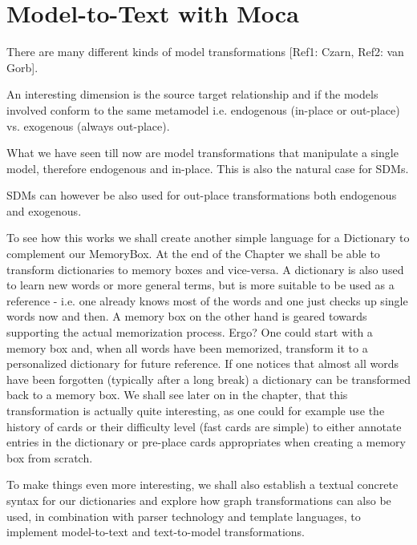 \chapter{Model-to-Text with Moca}

There are many different kinds of model transformations [Ref1: Czarn, Ref2: van Gorb].

An interesting dimension is the source target relationship and if the models involved conform to the same metamodel i.e. endogenous (in-place or out-place) vs. exogenous (always out-place).

What we have seen till now are model transformations that manipulate a single model, therefore endogenous and in-place.  This is also the natural case for SDMs.

SDMs can however be also used for out-place transformations both endogenous and exogenous.

To see how this works we shall create another simple language for a Dictionary to complement our MemoryBox.  At the end of the Chapter we shall be able to transform dictionaries to memory boxes and vice-versa.  A dictionary is also used to learn new words or more general terms, but is more suitable to be used as a reference - i.e. one already knows most of the words and one just checks up single words now and then.  A memory box on the other hand is geared towards supporting the actual memorization process.  Ergo?  One could start with a memory box and, when all words have been memorized, transform it to a personalized dictionary for future reference.  If one notices that almost all words have been forgotten (typically after a long break) a dictionary can be transformed back to a memory box.  We shall see later on in the chapter, that this transformation is actually quite interesting, as one could for example use the history of cards or their difficulty level (fast cards are simple) to either annotate entries in the dictionary or pre-place cards appropriates when creating a memory box from scratch. 

To make things even more interesting, we shall also establish a textual concrete syntax for our dictionaries and explore how graph transformations can also be used, in combination with parser technology and template languages, to implement model-to-text and text-to-model transformations.



